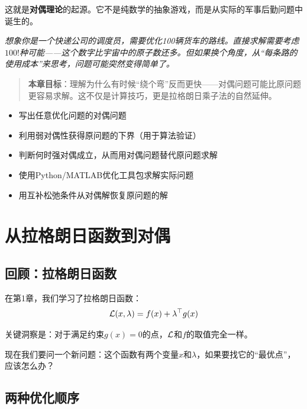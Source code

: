 这就是\textbf{对偶理论}的起源。它不是纯数学的抽象游戏，而是从实际的军事后勤问题中诞生的。

\vspace{0.5cm}
\noindent\textit{想象你是一个快递公司的调度员，需要优化100辆货车的路线。直接求解需要考虑$100!$种可能——这个数字比宇宙中的原子数还多。但如果换个角度，从“每条路的使用成本”来思考，问题可能突然变得简单了。}

\begin{quote}
\textbf{本章目标}：理解为什么有时候“绕个弯”反而更快——对偶问题可能比原问题更容易求解。这不仅是计算技巧，更是拉格朗日乘子法的自然延伸。
\end{quote}

\begin{tcolorbox}[colback=green!5, colframe=green!60!black, title=学完这章，你将能够...]
\begin{itemize}
    \item 写出任意优化问题的对偶问题
    \item 利用弱对偶性获得原问题的下界（用于算法验证）
    \item 判断何时强对偶成立，从而用对偶问题替代原问题求解
    \item 使用Python/MATLAB优化工具包求解实际问题
    \item 用互补松弛条件从对偶解恢复原问题的解
\end{itemize}
\end{tcolorbox}

\section{从拉格朗日函数到对偶}

\subsection{回顾：拉格朗日函数}

在第1章，我们学习了拉格朗日函数：
\[
\mathcal{L}(x, \lambda) = f(x) + \lambda^\top g(x)
\]

关键洞察是：对于满足约束$g(x) = 0$的点，$\mathcal{L}$和$f$的取值完全一样。

现在我们要问一个新问题：这个函数有两个变量$x$和$\lambda$，如果要找它的“最优点”，应该怎么办？

\subsection{两种优化顺序}

